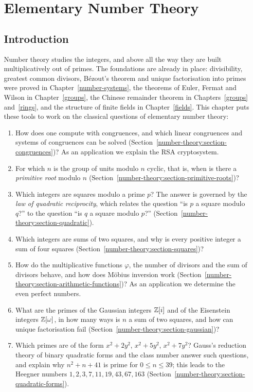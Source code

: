 \chapter{Elementary Number Theory}\label{number-theory}

\section{Introduction}\label{number-theory:section-introduction}

Number theory studies the integers, and above all the way they are built multiplicatively out of primes. The foundations are already in place: divisibility, greatest common divisors,
B\'ezout's theorem and unique factorisation into primes were proved in Chapter~\ref{number-systems}, the theorems of Euler, Fermat and Wilson in Chapter~\ref{groups}, the Chinese remainder theorem
in Chapters~\ref{groups} and~\ref{rings}, and the structure of finite fields in Chapter~\ref{fields}. This chapter puts these tools to work on the classical questions of elementary number theory:
\begin{enumerate}
\item How does one compute with congruences, and which linear congruences and systems of congruences can be solved (Section~\ref{number-theory:section-congruences})? As an application we explain the RSA
cryptosystem.
\item For which $n$ is the group of units modulo $n$ cyclic, that is, when is there a \emph{primitive root} modulo $n$ (Section~\ref{number-theory:section-primitive-roots})?
\item Which integers are squares modulo a prime $p$? The answer is governed by the \emph{law of quadratic reciprocity}, which relates the question ``is $p$ a square modulo $q$?'' to the question ``is $q$ a square
modulo $p$?'' (Section~\ref{number-theory:section-quadratic}).
\item Which integers are sums of two squares, and why is every positive integer a sum of four squares (Section~\ref{number-theory:section-squares})?
\item How do the multiplicative functions $\varphi$, the number of divisors and the sum of divisors behave, and how does M\"obius inversion work (Section~\ref{number-theory:section-arithmetic-functions})? As
an application we determine the even perfect numbers.
\item What are the primes of the Gaussian integers $\mathbb{Z}[i]$ and of the Eisenstein integers $\mathbb{Z}[\omega]$, in how many ways is $n$ a sum of two squares, and how can unique factorisation fail
(Section~\ref{number-theory:section-gaussian})?
\item Which primes are of the form $x^2 + 2y^2$, $x^2 + 5y^2$, $x^2 + 7y^2$? Gauss's reduction theory of binary quadratic forms and the class number answer such questions, and explain why
$n^2 + n + 41$ is prime for $0 \leq n \leq 39$; this leads to the Heegner numbers $1, 2, 3, 7, 11, 19, 43, 67, 163$ (Section~\ref{number-theory:section-quadratic-forms}).
\end{enumerate}
